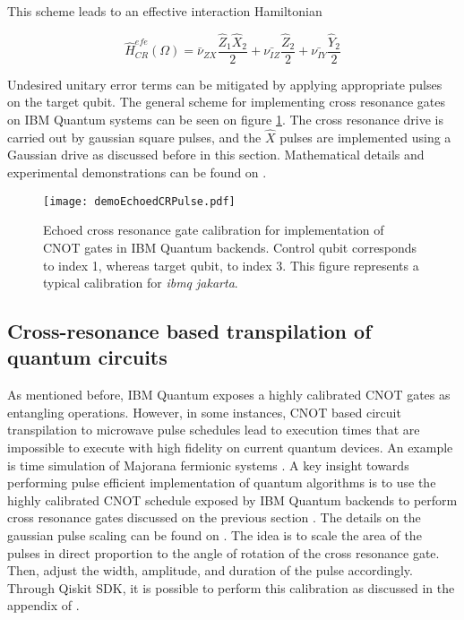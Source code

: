   This scheme leads to an effective interaction Hamiltonian \cite{DuplicatedRXZPulse}

  \begin{equation}
    \hat{H}_{CR}^{efe}(\Omega) = \bar{\nu}_{ZX} \frac{\hat{Z}_1\hat{X}_2}{2} + \bar{\nu_{IZ}} \frac{\hat{Z}_2}{2} + \bar{\nu_{IY}} \frac{\hat{Y}_2}{2}
    \label{eq:effectiveHamiltonian}
  \end{equation}

  Undesired unitary error terms can be mitigated by applying appropriate pulses on the target qubit. The general scheme for implementing cross resonance gates on IBM Quantum systems can be seen on figure \ref{fig:echoedPulseQiskit}. The cross resonance drive is carried out by gaussian square pulses, and the $\hat{X}$ pulses are implemented using a Gaussian drive as discussed before in this section. Mathematical details and experimental demonstrations can be found on \cite{DuplicatedRXZPulse, 2016RZXCalibration}.

  \begin{figure}
    \centering
    \texttt{[image: demoEchoedCRPulse.pdf]}
    \caption{Echoed cross resonance gate calibration for implementation of CNOT gates in IBM Quantum backends. Control qubit corresponds to index 1, whereas target qubit, to index 3. This figure represents a typical calibration for \textit{ibmq jakarta}.}
    \label{fig:echoedPulseQiskit}
  \end{figure}

  \subsection{Cross-resonance based transpilation of quantum circuits}

  As mentioned before, IBM Quantum exposes a highly calibrated CNOT gates as entangling operations. However, in some instances, CNOT based circuit transpilation to microwave pulse schedules lead to execution times that are impossible to execute with high fidelity on current quantum devices. An example is time simulation of Majorana fermionic systems \cite{MajoranaSimulation}. A key insight towards performing pulse efficient implementation of quantum algorithms is to use the highly calibrated CNOT schedule exposed by IBM Quantum backends to perform cross resonance gates discussed on the previous section \cite{MajoranaSimulation, RXZPulseEfficient}. The details on the gaussian pulse scaling can be found on \cite{MajoranaSimulation}. The idea is to scale the area of the pulses in direct proportion to the angle of rotation of the cross resonance gate. Then, adjust the width, amplitude, and duration of the pulse accordingly. Through Qiskit SDK, it is possible to perform this calibration as discussed in the appendix of \cite{RXZPulseEfficient}.

